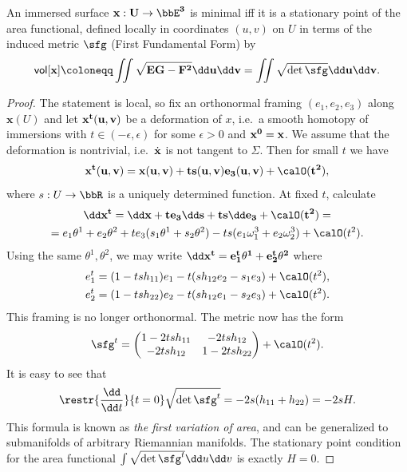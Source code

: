 \begin{prop}
    An immersed surface $\bf{x}:U\to \bbE^3$ is minimal iff it is a stationary point of the area functional, defined locally in coordinates $(u,v)$ on $U$ in terms of the induced metric $\sfg$ (First Fundamental Form) by
    \[\mathsf{vol}[\bf{x}]\coloneqq \iint \sqrt{EG-F^2}\dd u\dd v=\iint \sqrt{\det\sfg}\dd u\dd v.\]
\end{prop}
\begin{proof}
    The statement is local, so fix an orthonormal framing $(e_1,e_2,e_3)$ along $\bm{x}(U)$ and let $\bf{x}^t(u,v)$ be a deformation of $x$, i.e.~a smooth homotopy of immersions with $t\in (-\epsilon,\epsilon)$ for some $\epsilon>0$ and $\bf{x}^0=\bf{x}$. We assume that the deformation is nontrivial, i.e.\ $\dot{\bf{x}}$ is not tangent to $\Sigma$. Then for small $t$ we have 
    \[\bf{x}^t(u,v)=\bf{x}(u,v)+t s(u,v)e_3(u,v)+\calO(t^2),\]
    where $s:U\to \bbR$ is a uniquely determined function. At fixed $t$, calculate 
    \begin{multline}
        \dd \bf{x}^t=\dd\bf{x}+te_3\dd s+ts\dd e_3+\calO(t^2)=\\
        =e_1\theta^1+e_2\theta^2+te_3(s_1\theta^1+s_2\theta^2)-ts(e_1\omega_1^3+e_2\omega_2^3)+\calO(t^2).
    \end{multline}
    Using the same $\theta^1,\theta^2$, we may write $\dd\bf{x}^t=e_1^t\theta^1+e_2^t\theta^2$ where 
    \begin{align}
        e_1^t&= (1-tsh_{11})e_1-t(sh_{12}e_2-s_1e_3)+\calO(t^2),\\
        e_2^t&= (1-tsh_{22})e_2-t(sh_{12}e_1-s_2e_3)+\calO(t^2).
    \end{align}
    This framing is no longer orthonormal. The metric now has the form 
    \[\sfg^t=\begin{pmatrix}
        1-2tsh_{11} & -2tsh_{12}\\
        -2tsh_{12} & 1-2tsh_{22}
    \end{pmatrix}+\calO(t^2).\]
    It is easy to see that
    \[\restr{\frac{\dd}{\dd t}}{t=0}\sqrt{\det \sfg^t}=-2s(h_{11}+h_{22})=-2sH.\]
    This formula is known as \emph{the first variation of area}, and can be generalized to submanifolds of arbitrary Riemannian manifolds. The stationary point condition for the area functional $\int \sqrt{\det\sfg^t}\dd u\dd v$ is exactly $H=0$.
\end{proof}

